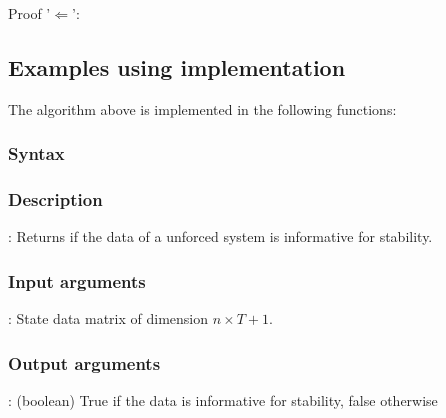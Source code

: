 Proof '$\Leftarrow$': \\


\subsection{Examples using implementation}
The algorithm above is implemented in the following functions:
\subsubsection*{Syntax}

\subsubsection*{Description}
: Returns if the data of a unforced system is informative for stability.

\subsubsection*{Input arguments}
\textbf{}: State data matrix of dimension $n \times T+1$.

\subsubsection*{Output arguments}
\textbf{}: (boolean) True if the data is informative for stability, false otherwise


